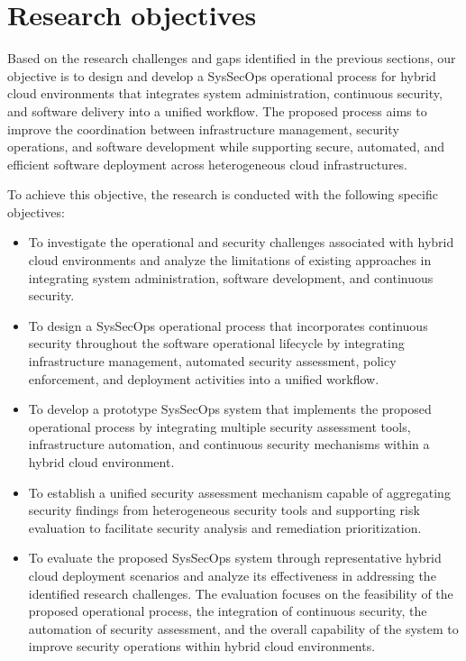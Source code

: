 \section{Research objectives}
\label{sec:Objectives}
Based on the research challenges and gaps identified in the previous sections, our objective is to design and develop a SysSecOps operational process for hybrid cloud environments that integrates system administration, continuous security, and software delivery into a unified workflow. The proposed process aims to improve the coordination between infrastructure management, security operations, and software development while supporting secure, automated, and efficient software deployment across heterogeneous cloud infrastructures.

To achieve this objective, the research is conducted with the following specific objectives:

\begin{itemize}
    \item To investigate the operational and security challenges associated with hybrid cloud environments and analyze the limitations of existing approaches in integrating system administration, software development, and continuous security.

    \item To design a SysSecOps operational process that incorporates continuous security throughout the software operational lifecycle by integrating infrastructure management, automated security assessment, policy enforcement, and deployment activities into a unified workflow.

    \item To develop a prototype SysSecOps system that implements the proposed operational process by integrating multiple security assessment tools, infrastructure automation, and continuous security mechanisms within a hybrid cloud environment.

    \item To establish a unified security assessment mechanism capable of aggregating security findings from heterogeneous security tools and supporting risk evaluation to facilitate security analysis and remediation prioritization.

    \item To evaluate the proposed SysSecOps system through representative hybrid cloud deployment scenarios and analyze its effectiveness in addressing the identified research challenges. The evaluation focuses on the feasibility of the proposed operational process, the integration of continuous security, the automation of security assessment, and the overall capability of the system to improve security operations within hybrid cloud environments.
\end{itemize}